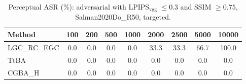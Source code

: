 \begin{table}[t]
\centering\footnotesize
\caption{Perceptual ASR (\%): adversarial with LPIPS$_{\mathrm{vgg}}$ $\le 0.3$ and SSIM $\ge 0.75$, Salman2020Do\_R50, targeted.}
\begin{tabular}{lcccccccc}
\toprule
Method & 100 & 200 & 500 & 1000 & 2000 & 2500 & 5000 & 10000 \\
\midrule
LGC\_RC\_EGC & 0.0 & 0.0 & 0.0 & 0.0 & 33.3 & 33.3 & 66.7 & 100.0 \\
TtBA & 0.0 & 0.0 & 0.0 & 0.0 & 0.0 & 0.0 & 0.0 & 0.0 \\
CGBA\_H & 0.0 & 0.0 & 0.0 & 0.0 & 0.0 & 0.0 & 0.0 & 0.0 \\
\bottomrule
\end{tabular}
\end{table}
